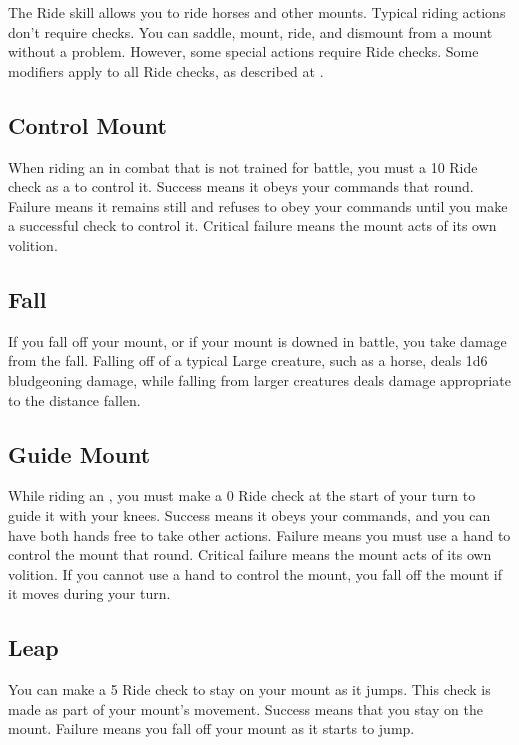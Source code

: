 \newpage
{}
        The Ride skill allows you to ride horses and other mounts. Typical riding actions don't require checks. You can saddle, mount, ride, and dismount from a mount without a problem. However, some special actions require Ride checks. Some modifiers apply to all Ride checks, as described at .

    \subsection{Control Mount}
        When riding an  in combat that is not trained for battle, you must a  10 Ride check as a  to control it. Success means it obeys your commands that round. Failure means it remains still and refuses to obey your commands until you make a successful check to control it. Critical failure means the mount acts of its own volition.

    \subsection{Fall}
        If you fall off your mount, or if your mount is downed in battle, you take damage from the fall.
        Falling off of a typical Large creature, such as a horse, deals 1d6 bludgeoning damage, while falling from larger creatures deals damage appropriate to the distance fallen.

    \subsection{Guide Mount}
        While riding an , you must make a  0 Ride check at the start of your turn to guide it with your knees. Success means it obeys your commands, and you can have both hands free to take other actions. Failure means you must use a hand to control the mount that round. Critical failure means the mount acts of its own volition. If you cannot use a hand to control the mount, you fall off the mount if it moves during your turn.

    \subsection{Leap}
        You can make a  5 Ride check to stay on your mount as it jumps. This check is made as part of your mount's movement. Success means that you stay on the mount. Failure means you fall off your mount as it starts to jump.

